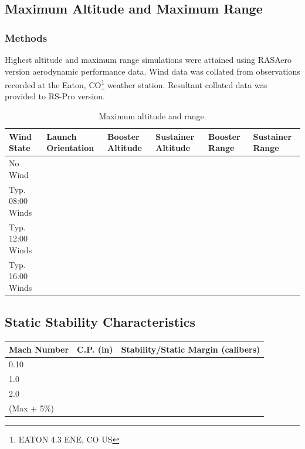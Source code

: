 \documentclass[12pt]{article}
\newcommand{\ph}{\framebox[48pt]{\rule{0pt}{12pt}}}
\begin{document}
\subsection{Maximum Altitude and Maximum Range}
\subsubsection{Methods}
Highest altitude and maximum range simulations were attained using RASAero version \ph aerodynamic performance data.
Wind data was collated from observations recorded at the Eaton, CO\footnote{EATON 4.3 ENE, CO US} weather station.
Resultant collated data was provided to RS-Pro version\ph.
\begin{table}[H]
    \centering
    \caption{Maximum altitude and range.}
    \label{tab:winds}
    \begin{tabular}{|p{1in}|p{1in}|p{1in}|p{1in}|p{1in}|p{1in}|}
        \hline
        Wind State & Launch Orientation & Booster Altitude & Sustainer Altitude & Booster Range & Sustainer Range \\ \hline
        No Wind    & \ph                & \ph              & \ph                & \ph           &  \ph \\ \hline
        Typ. 08:00 Winds    & \ph                & \ph              & \ph                & \ph           & \ph \\ \hline
        Typ. 12:00 Winds    & \ph                & \ph              & \ph                & \ph           & \ph \\ \hline
        Typ. 16:00 Winds    & \ph                & \ph              & \ph                & \ph           & \ph \\ \hline
    \end{tabular}
\end{table}
\subsection{Static Stability Characteristics}
\begin{table}[H]
    \centering
    \begin{tabular}{|l|l|l|}
        \hline
        Mach Number & C.P. (in) & Stability/Static Margin (calibers) \\ \hline
        0.10        & \ph       &  \ph \\ \hline
        1.0         & \ph       & \ph \\ \hline
        2.0         & \ph       & \ph \\ \hline
        \ph (Max + 5\%)         & \ph       & \ph \\ \hline
    \end{tabular}
\end{table}
\end{document}
